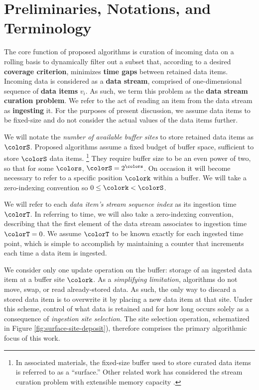 \section{Preliminaries, Notations, and Terminology} \label{sec:notation}



The core function of proposed algorithms is curation of incoming data on a rolling basis to dynamically filter out a subset that, according to a desired \textbf{coverage criterion}, minimizes \textbf{time gaps} between retained data items.
Incoming data is considered as a \textbf{data stream}, comprised of  one-dimensional sequence of \textbf{data items} $v_i$.
As such, we term this problem as the \textbf{data stream curation problem}.
We refer to the act of reading an item from the data stream as \textbf{ingesting} it.
For the purposes of present discussion, we assume data items to be fixed-size and do not consider the actual values of the data items further.

We will notate the \textit{number of available buffer sites} to store retained data items as $\colorS$.
Proposed algorithms assume a fixed budget of buffer space, sufficient to store $\colorS$ data items.%
\footnote{%
In associated materials, the fixed-size buffer used to store curated data items is referred to as a ``surface.''
Other related work has considered the stream curation problem with extensible memory capacity \citep{moreno2024algorithms}.%
}
They require buffer size to be an even power of two, so that for some $\colors$, $\colorS = 2^{\colors}$.
On occasion it will become necessary to refer to a specific position $\colork$ within a buffer.
We will take a zero-indexing convention so $0 \leq \colork < \colorS$.

We will refer to each \textit{data item's stream sequence index} as its ingestion time $\colorT$.
In referring to time, we will also take a zero-indexing convention, describing that the first element of the data stream associates to ingestion time $\colorT=0$.
We assume $\colorT$ to be known exactly for each ingested time point, which is simple to accomplish by maintaining a counter that increments each time a data item is ingested.

We consider only one update operation on the buffer: storage of an ingested data item at a buffer site $\colork$.
As a \textit{simplifying limitation}, algorithms do not move, swap, or read already-stored data.
As such, the only way to discard a stored data item is to overwrite it by placing a new data item at that site.
Under this scheme, control of what data is retained and for how long occurs solely as a consequence of \textit{ingestion site selection}.
The site selection operation, schematized in Figure \ref{fig:surface-site-deposit}), therefore comprises the primary algorithmic focus of this work.

